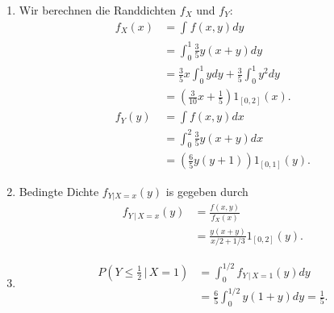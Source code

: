 \solution 
\begin{enumerate}
    \item Wir berechnen die Randdichten $f_{X}$ und $f_{Y}$:
        \begin{align*}
            f_{X}(x) &= \int_{}^{} f(x,y) dy \\
            &= \int_{0}^{1} \frac{3}{5} y(x+y) dy \\
            &= \frac{3}{5} x \int_{0}^{1} y dy + \frac{3}{5} \int_{0}^{1} y^{2} dy \\
            &= \left( \frac{3}{10}x + \frac{1}{5} \right) 1_{[0,2]}(x). \\
            f_{Y}(y) &= \int f(x,y) dx \\
            &= \int_{0}^{2} \frac{3}{5} y(x+y) dx \\
            &= \left( \frac{6}{5} y \left( y+1 \right) \right) 1_{[0,1]}(y).
        \end{align*}

    \item Bedingte Dichte $f_{Y | X=x}(y)$ is gegeben durch
        \begin{align*}
            f_{Y \,|\, X=x}(y) &= \frac{f(x,y)}{f_{X}(x)} \\
            &= \frac{y(x+y)}{ x/2 + 1/3} 1_{[0,2]}(y).
        \end{align*}

    \item 
        \begin{align*}
            P\left( Y \leq \frac{1}{2} \,|\, X=1 \right) &=
            \int^{1/2}_{0} f_{Y \,|\, X=1} (y) dy \\
            &= \frac{6}{5} \int^{1/2}_{0} y(1+y) dy = \frac{1}{5}. 
        \end{align*}
\end{enumerate}

